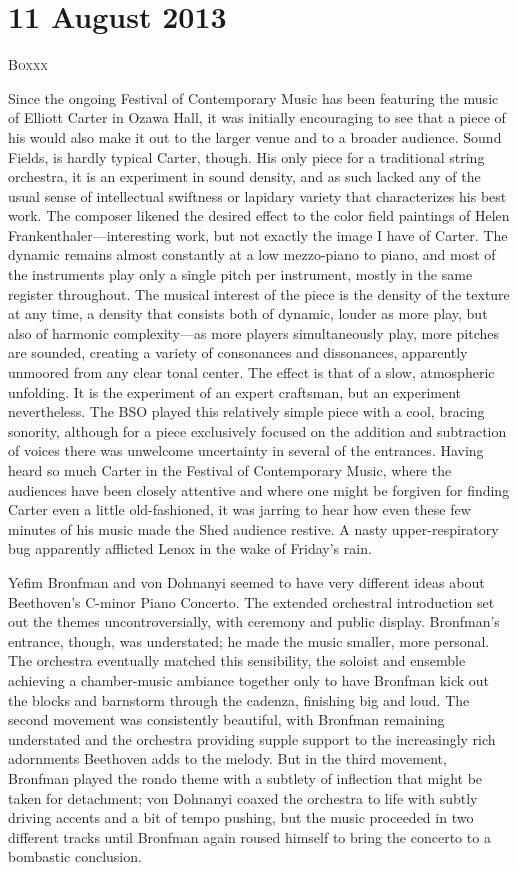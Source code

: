 \chapter{11 August 2013}

\textsc{Boxxx}

Since the ongoing Festival of Contemporary Music has been featuring the music of Elliott Carter in Ozawa Hall, it was initially encouraging to see that a piece of his would also make it out to the larger venue and to a broader audience. Sound Fields, is hardly typical Carter, though. His only piece for a traditional string orchestra, it is an experiment in sound density, and as such lacked any of the usual sense of intellectual swiftness or lapidary variety that characterizes his best work. The composer likened the desired effect to the color field paintings of Helen Frankenthaler—interesting work, but not exactly the image I have of Carter. The dynamic remains almost constantly at a low mezzo-piano to piano, and most of the instruments play only a single pitch per instrument, mostly in the same register throughout. The musical interest of the piece is the density of the texture at any time, a density that consists both of dynamic, louder as more play, but also of harmonic complexity—as more players simultaneously play, more pitches are sounded, creating a variety of consonances and dissonances, apparently unmoored from any clear tonal center. The effect is that of a slow, atmospheric unfolding. It is the experiment of an expert craftsman, but an experiment nevertheless. The BSO played this relatively simple piece with a cool, bracing sonority, although for a piece exclusively focused on the addition and subtraction of voices there was unwelcome uncertainty in several of the entrances. Having heard so much Carter in the Festival of Contemporary Music, where the audiences have been closely attentive and where one might be forgiven for finding Carter even a little old-fashioned, it was jarring to hear how even these few minutes of his music made the Shed audience restive. A nasty upper-respiratory bug apparently afflicted Lenox in the wake of Friday’s rain.

Yefim Bronfman and von Dohnanyi seemed to have very different ideas about Beethoven’s C-minor Piano Concerto. The extended orchestral introduction set out the themes uncontroversially, with ceremony and public display. Bronfman’s entrance, though, was understated; he made the music smaller, more personal. The orchestra eventually matched this sensibility, the soloist and ensemble achieving a chamber-music ambiance together only to have Bronfman kick out the blocks and barnstorm through the cadenza, finishing big and loud. The second movement was consistently beautiful, with Bronfman remaining understated and the orchestra providing supple support to the increasingly rich adornments Beethoven adds to the melody. But in the third movement, Bronfman played the rondo theme with a subtlety of inflection that might be taken for detachment; von Dohnanyi coaxed the orchestra to life with subtly driving accents and a bit of tempo pushing, but the music proceeded in two different tracks until Bronfman again roused himself to bring the concerto to a bombastic conclusion.

